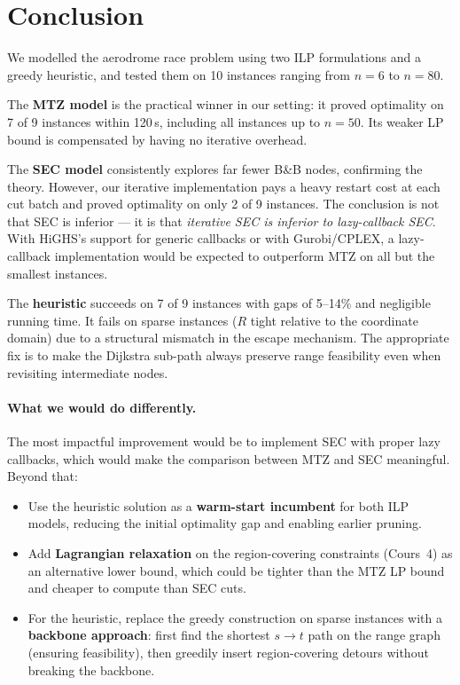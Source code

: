 \documentclass[12pt, a4paper]{article}
\begin{document}
\section{Conclusion}

We modelled the aerodrome race problem using two ILP formulations and a greedy
heuristic, and tested them on 10 instances ranging from $n = 6$ to $n = 80$.

The \textbf{MTZ model} is the practical winner in our setting: it proved optimality
on 7 of 9 instances within 120\,s, including all instances up to $n = 50$. Its
weaker LP bound is compensated by having no iterative overhead.

The \textbf{SEC model} consistently explores far fewer B\&B nodes, confirming the
theory. However, our iterative implementation pays a heavy restart cost at each cut
batch and proved optimality on only 2 of 9 instances. The conclusion is not that
SEC is inferior --- it is that \emph{iterative SEC is inferior to lazy-callback
SEC}. With HiGHS's support for generic callbacks or with Gurobi/CPLEX, a
lazy-callback implementation would be expected to outperform MTZ on all but the
smallest instances.

The \textbf{heuristic} succeeds on 7 of 9 instances with gaps of 5--14\% and
negligible running time. It fails on sparse instances ($R$ tight relative to the
coordinate domain) due to a structural mismatch in the escape mechanism. The
appropriate fix is to make the Dijkstra sub-path always preserve range feasibility
even when revisiting intermediate nodes.

\paragraph{What we would do differently.}
The most impactful improvement would be to implement SEC with proper lazy callbacks,
which would make the comparison between MTZ and SEC meaningful. Beyond that:
\begin{itemize}[nosep]
  \item Use the heuristic solution as a \textbf{warm-start incumbent} for both ILP
        models, reducing the initial optimality gap and enabling earlier pruning.
  \item Add \textbf{Lagrangian relaxation} on the region-covering constraints
        (Cours~4) as an alternative lower bound, which could be tighter than the MTZ
        LP bound and cheaper to compute than SEC cuts.
  \item For the heuristic, replace the greedy construction on sparse instances with
        a \textbf{backbone approach}: first find the shortest $s \to t$ path on the
        range graph (ensuring feasibility), then greedily insert region-covering
        detours without breaking the backbone.
\end{itemize}

\newpage



\end{document}
